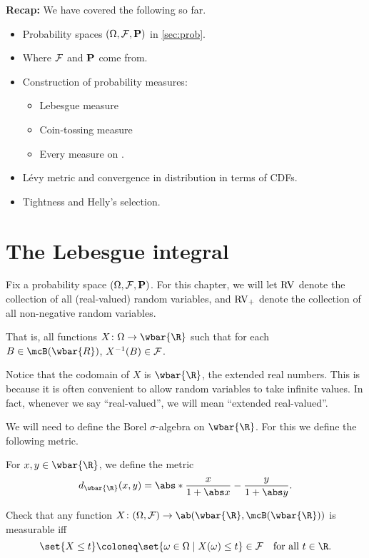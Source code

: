 \textbf{Recap:} We have covered the following so far.
\begin{itemize}
    \item Probability spaces $(\Omega, \F, \P)$ in \cref{sec:prob}.
    \item Where $\F$ and $\P$ come from.
    \item Construction of probability measures:
    \begin{itemize}
        \item Lebesgue measure
        \item Coin-tossing measure
        \item Every measure on \R.
    \end{itemize}
    \item L\'evy metric and convergence in distribution in terms of CDFs.
    \item Tightness and Helly's selection.
\end{itemize}

\chapter{The Lebesgue integral} \label{chp:lebesgue}
Fix a probability space $(\Omega, \F, \P)$.
For this chapter, we will let $\RV$ denote the collection
of all (real-valued) random variables,
and $\RV_+$ denote the collection of all non-negative random variables.

That is, all functions $X\colon \Omega \to \wbar{\R}$ such that for each
$B \in \mcB(\wbar{R})$, $X^{-1}(B) \in \F$.

Notice that the codomain of $X$ is $\wbar{\R}$, the extended real numbers.
This is because it is often convenient to allow random variables to take
infinite values.
In fact, whenever we say ``real-valued'',
we will mean ``extended real-valued''.

We will need to define the Borel $\sigma$-algebra on $\wbar{\R}$.
For this we define the following metric.
\begin{definition} \label{def:metric-extended-reals}
    For $x, y \in \wbar{\R}$, we define the metric \[
        d_{\wbar{\R}}(x, y) =
            \abs*{\frac{x}{1 + \abs x} - \frac{y}{1 + \abs y}}.
    \]
\end{definition}

\begin{exercise}
    Check that any function
    $X\colon (\Omega, \F) \to \ab(\wbar{\R}, \mcB(\wbar{\R}))$
    is measurable iff \[
        \set{X \le t} \coloneq \set{\omega \in \Omega \mid X(\omega) \le t}
        \in \F \quad \text{for all } t \in \R.
    \]
\end{exercise}

